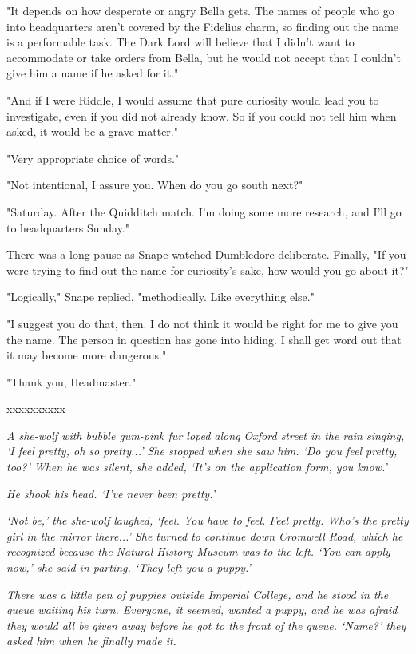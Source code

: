 \documentclass[a4paper,11pt]{article}
\begin{document}
"It depends on how desperate or angry Bella gets. The names of people who go into headquarters aren't covered by the Fidelius charm, so finding out the name is a performable task. The Dark Lord will believe that I didn't want to accommodate or take orders from Bella, but he would not accept that I couldn't give him a name if he asked for it."

"And if I were Riddle, I would assume that pure curiosity would lead you to investigate, even if you did not already know. So if you could not tell him when asked, it would be a grave matter."

"Very appropriate choice of words."

"Not intentional, I assure you. When do you go south next?"

"Saturday. After the Quidditch match. I'm doing some more research, and I'll go to headquarters Sunday."

There was a long pause as Snape watched Dumbledore deliberate. Finally, "If you were trying to find out the name for curiosity's sake, how would you go about it?"

"Logically," Snape replied, "methodically. Like everything else."

"I suggest you do that, then. I do not think it would be right for me to give you the name. The person in question has gone into hiding. I shall get word out that it may become more dangerous."

"Thank you, Headmaster."

xxxxxxxxxx

\emph{A she-wolf with bubble gum-pink fur loped along Oxford street in the rain singing, `I feel pretty, oh so pretty...' She stopped when she saw him. `Do you feel pretty, too?' When he was silent, she added, `It's on the application form, you know.'}

\emph{He shook his head. `I've never been pretty.'}

\emph{`Not be,' the she-wolf laughed, `feel. You have to feel. Feel pretty. Who's the pretty girl in the mirror there...' She turned to continue down Cromwell Road, which he recognized because the Natural History Museum was to the left. `You can apply now,' she said in parting. `They left you a puppy.'}

\emph{There was a little pen of puppies outside Imperial College, and he stood in the queue waiting his turn. Everyone, it seemed, wanted a puppy, and he was afraid they would all be given away before he got to the front of the queue. `Name?' they asked him when he finally made it.}
\end{document}
